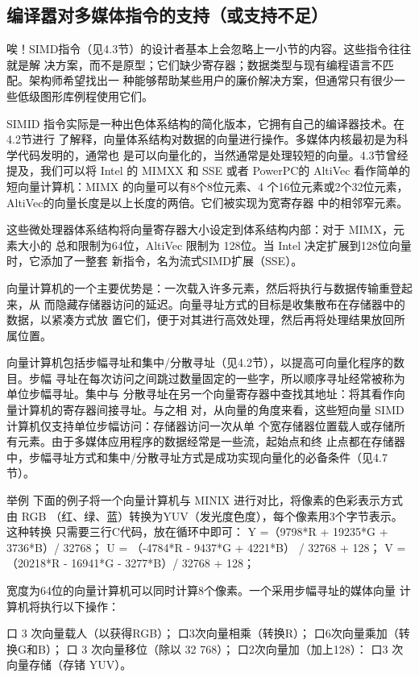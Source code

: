 \subsection{编译嚣对多媒体指令的支持（或支持不足）}
唉！SIMD指令（见4.3节）的设计者基本上会忽略上一小节的内容。这些指令往往就是解
决方案，而不是原型；它们缺少寄存器；数据类型与现有编程语言不匹配。架构师希望找出一
种能够帮助某些用户的廉价解决方案，但通常只有很少一些低级图形库例程使用它们。

SIMID 指令实际是一种出色体系结构的简化版本，它拥有自己的编译器技术。在4.2节进行
了解释，向量体系结构对数据的向量进行操作。多媒体内核最初是为科学代码发明的，通常也
是可以向量化的，当然通常是处理较短的向量。4.3节曾经提及，我们可以将 Intel 的 MIMXX 和
SSE 或者 PowerPC的 AltiVec 看作简单的短向量计算机：MIMX 的向量可以有8个8位元素、4
个16位元素或2个32位元素，AltiVec的向量长度是以上长度的两倍。它们被实现为宽寄存器
中的相邻窄元素。

这些微处理器体系结构将向量寄存器大小设定到体系结构内部：对于 MIMX，元素大小的
总和限制为64位，AltiVec 限制为 128位。当 Intel 决定扩展到128位向量时，它添加了一整套
新指令，名为流式SIMD扩展（SSE）。

向量计算机的一个主要优势是：一次载入许多元素，然后将执行与数据传输重登起来，从
而隐藏存储器访问的延迟。向量寻址方式的目标是收集散布在存储器中的数据，以紧凑方式放
置它们，便于对其进行高效处理，然后再将处理结果放回所属位置。

向量计算机包括步幅寻址和集中/分散寻址（见4.2节），以提高可向量化程序的数目。步幅
寻址在每次访问之间跳过数量固定的一些字，所以顺序寻址经常被称为单位步幅寻址。集中与
分散寻址在另一个向量寄存器中查找其地址：将其看作向量计算机的寄存器间接寻址。与之相
对，从向量的角度来看，这些短向量 SIMD 计算机仅支持单位步幅访问：存储器访问一次从单
个宽存储器位置载人或存储所有元素。由于多媒体应用程序的数据经常是一些流，起始点和终
止点都在存储器中，步幅寻址方式和集中/分散寻址方式是成功实现向量化的必备条件（见4.7
节）。

举例
下面的例子将一个向量计算机与 MINIX 进行对比，将像素的色彩表示方式由 RGB
（红、绿、蓝）转换为YUV（发光度色度），每个像素用3个字节表示。这种转换
只需要三行C代码，放在循环中即可：
Y =（9798*R + 19235*G + 3736*B）/ 32768；
U = （-4784*R - 9437*G
+ 4221*B）
/ 32768 + 128；
V =（20218*R - 16941*G - 3277*B）/ 32768 + 128；

宽度为64位的向量计算机可以同时计算8个像素。一个采用步幅寻址的媒体向量
计算机将执行以下操作：

口 3 次向量载人（以获得RGB）；
口3次向量相乘（转换R）；
口6次向量乘加（转换G和B）；
口 3 次向量移位（除以 32 768）；
口2次向量加（加上128）：
口3 次向量存储（存锗 YUV）。

